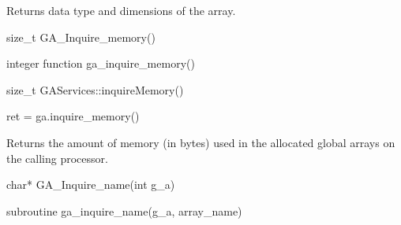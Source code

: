 \documentclass[12pt]{article}
\begin{document}
\local

\begin{desc}

Returns data type and dimensions of the array.

\end{desc}


\begin{capi}
\begin{ccode}
size_t GA_Inquire_memory()
\end{ccode}
\end{capi}

\begin{fapi}
\begin{fcode}
integer function ga_inquire_memory()
\end{fcode}
\end{fapi}

\begin{cxxapi}
\begin{cxxcode}
size_t GAServices::inquireMemory()
\end{cxxcode}
\end{cxxapi}

\begin{pyapi}
\begin{pycode}
ret = ga.inquire_memory()
\end{pycode}
\end{pyapi}

\begin{desc}

Returns the amount of memory (in bytes) used in the allocated global arrays on
the calling processor.

\end{desc}


\begin{capi}
\begin{ccode}
char* GA_Inquire_name(int g_a)
\end{ccode}
\begin{funcargs}
\end{funcargs}
\end{capi}

\begin{fapi}
\begin{fcode}
subroutine ga_inquire_name(g_a, array_name)
\end{fcode}
\begin{funcargs}
\end{funcargs}
\end{fapi}
\end{document}
